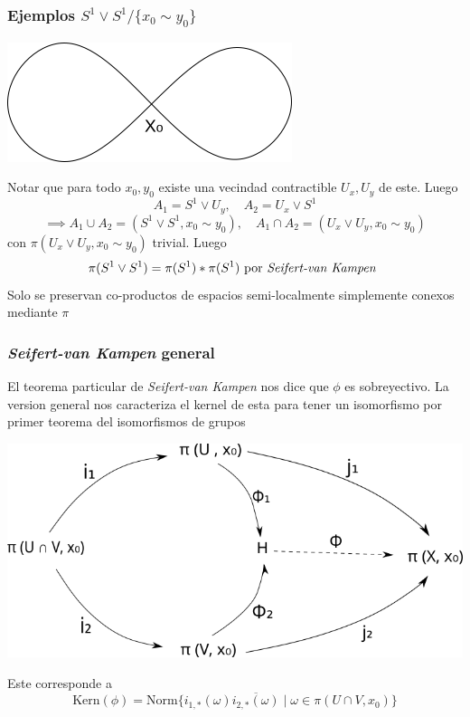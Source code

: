 \documentclass[xetex,mathserif,serif]{beamer}
\newcommand{\vank}{\emph{Seifert-van Kampen} }
\begin{document}
  \begin{frame}
    \frametitle{Ejemplos \(S^1 \vee S^1 / \{x_0 \sim y_0\}\)}
    \begin{center}
      \includegraphics[scale=0.4]{../tesis/imagenes/figura8.png}
    \end{center}
    \pause
    Notar que para todo \(x_0, y_0\) existe una vecindad contractible
    \(U_x, U_y\) de este. Luego
    \[ A_1 = S^1 \vee U_y , \quad A_2 = U_x \vee S^1 \]
    \[ \implies A_1 \cup A_2 = (S^1 \vee S^1, x_0 \sim y_0) , \quad A_1 \cap A_2
      = (U_x \vee U_y, x_0 \sim y_0) \]
    con \(\pi (U_x \vee U_y, {x_0 \sim y_0})\) trivial. Luego
    \[ \pi (S^1 \vee S^1) = \pi (S^1) * \pi (S^1) \text{ por \vank}\]
    \pause
    Solo se preservan co-productos de espacios semi-localmente
    simplemente conexos mediante \(\pi\)
  \end{frame}

  \begin{frame}
    \frametitle{\vank general}
    El teorema particular de \vank nos dice que \(\phi\) es
    sobreyectivo. La version general nos caracteriza el kernel de esta
    para tener un isomorfismo por primer teorema del isomorfismos de
    grupos
    \begin{center}
        \includegraphics[scale=.35]{../tesis/imagenes/van.png}
    \end{center}
    Este corresponde a
    \[ \text{Kern}(\phi) = \text{Norm}\{ i_{1,*} (\omega) \overline{i_{2,*}
        (\omega)} \mid \omega \in \pi (U \cap V , x_0)\}\]
  \end{frame}
\end{document}
